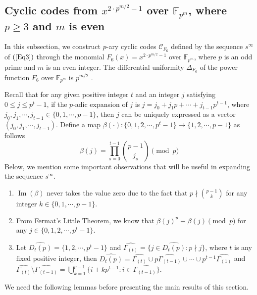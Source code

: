 \documentclass[pdflatex,sn-mathphys-num]{sn-jnl}%
\theoremstyle{thmstyleone}%
\theoremstyle{thmstyletwo}%
\theoremstyle{thmstylethree}%
\begin{document}
\subsection{Cyclic codes from $x^{2\cdot p^{m/2}-1}$ over $\mathbb{F}_{p^m}$, where $p\geq 3$ and $m$ is even}\label{sec8}
In this subsection, we construct $p$-ary cyclic codes $\mathcal{C}_{F_{6}}$ defined by the sequence $s^{\infty}$ of $(\ref{Eq3})$ through the monomial $F_{6}(x)=x^{2\cdot p^{m/2}-1}$ over $\mathbb{F}_{p^m}$, where $p$ is an odd prime and $m$ is an even integer. The differential uniformity $\Delta_{F_{6}}$ of  the power function $F_{6}$ over $\mathbb{F}_{p^m}$ is $p^{m/2}$ \cite{Uniform6}.    %

\par Recall that for any given positive integer $t$ and an integer $j$ satisfying $0\leq j\leq p^{t}-1$, if the $p$-adic expansion of $j$ is $j=j_{0}+j_{1}p+\cdots+j_{t-1}p^{t-1}$, where $j_{0},j_{1},\cdots,j_{t-1}\in\{0,1,\cdots,p-1\}$, then $j$ can be uniquely expressed as a vector $(j_{0},j_{1},\cdots,j_{t-1})$. Define a map $\beta(\cdot):\{0,1,2,\cdots,p^{t}-1\}\rightarrow\{1,2,\cdots,p-1\}$ as follows
\begin{equation}\label{Eq16}
    \beta(j) = \prod_{s=0}^{t-1}\binom{p-1}{j_s} \pmod{p}
\end{equation}
Below, we mention some important observations that will be useful in expanding the sequence $s^{\infty}$. 
\vspace{1mm}
\begin{enumerate}
    \item $\operatorname{Im}(\beta)$ never takes the value zero due to the fact that $p\nmid\binom{p-1}{k}$ for any integer $k\in\{0,1,\cdots,p-1\}$.
    \item From Fermat’s Little Theorem, we know that $\beta(j)^{p}\equiv\beta(j)\pmod{p}$ for any $j\in\{0,1,2,\cdots,p^{t}-1\}$.
    \item Let $\widehat{D_{t}(p)}=\{1,2,\cdots,p^{t}-1\}$ and $\widehat{\Gamma_{(t)}}=\{j\in\widehat{D_{t}(p)}:p\nmid j\}$, where $t$ is any fixed positive integer, then $\widehat{D_{t}(p)}=\widehat{\Gamma_{(t)}}\cup p\widehat{\Gamma_{(t-1)}}\cup\cdots\cup p^{t-1}\widehat{\Gamma_{(1)}}$ and $\widehat{\Gamma_{(t)}}\setminus\widehat{\Gamma_{(t-1)}}=\bigcup_{k=1}^{p-1}\{i+kp^{t-1}:i\in\widehat{\Gamma_{(t-1)}}\}$. 
\end{enumerate}
\vspace{1mm}
We need the following lemmas before presenting the main results of this section.
\end{document}
